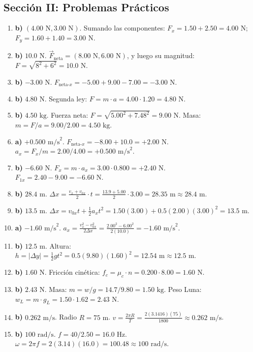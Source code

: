 \documentclass[11pt,a4paper]{article}
\begin{document}
\subsection*{Sección II: Problemas Prácticos}
\begin{enumerate}
    \item \textbf{b)} $(4.00 \text{ N}, 3.00 \text{ N})$. Sumando las componentes: $F_x = 1.50 + 2.50 = 4.00 \text{ N}$; $F_y = 1.60 + 1.40 = 3.00 \text{ N}$.
    \item \textbf{b)} $10.0 \text{ N}$. $\vec{F}_{\text{neta}} = (8.00\text{ N}, 6.00\text{ N})$, y luego su magnitud: $F = \sqrt{8^2 + 6^2} = 10.0 \text{ N}$.
    \item \textbf{b)} $-3.00 \text{ N}$. $F_{\text{neta-}x} = -5.00 + 9.00 - 7.00 = -3.00 \text{ N}$.
    \item \textbf{b)} $4.80 \text{ N}$. Segunda ley: $F = m \cdot a = 4.00 \cdot 1.20 = 4.80 \text{ N}$.
    \item \textbf{b)} $4.50 \text{ kg}$. Fuerza neta: $F = \sqrt{5.00^2 + 7.48^2} = 9.00 \text{ N}$. Masa: $m = F / a = 9.00 / 2.00 = 4.50 \text{ kg}$.
    \item \textbf{a)} $+0.500 \text{ m/s}^2$. $F_{\text{neta-}x} = -8.00 + 10.0 = +2.00 \text{ N}$. $a_x = F_x / m = 2.00 / 4.00 = +0.500 \text{ m/s}^2$.
    \item \textbf{b)} $-6.60 \text{ N}$. $F_x = m \cdot a_x = 3.00 \cdot 0.800 = +2.40 \text{ N}$. $F_{1x} = 2.40 - 9.00 = -6.60 \text{ N}$.
    \item \textbf{b)} $28.4 \text{ m}$. $\Delta x = \frac{v_x + v_{0x}}{2} \cdot t = \frac{13.9 + 5.00}{2} \cdot 3.00 = 28.35 \text{ m} \approx 28.4 \text{ m}$.
    \item \textbf{b)} $13.5 \text{ m}$. $\Delta x = v_{0x} t + \frac{1}{2} a_x t^2 = 1.50(3.00) + 0.5(2.00)(3.00)^2 = 13.5 \text{ m}$.
    \item \textbf{a)} $-1.60 \text{ m/s}^2$. $a_x = \frac{v_x^2 - v_{0x}^2}{2\Delta x} = \frac{2.00^2 - 6.00^2}{2(10.0)} = -1.60 \text{ m/s}^2$.
    \item \textbf{b)} $12.5 \text{ m}$. Altura: $h = |\Delta y| = \frac{1}{2} g t^2 = 0.5(9.80)(1.60)^2 = 12.54 \text{ m} \approx 12.5 \text{ m}$.
    \item \textbf{b)} $1.60 \text{ N}$. Fricción cinética: $f_c = \mu_c \cdot n = 0.200 \cdot 8.00 = 1.60 \text{ N}$.
    \item \textbf{b)} $2.43 \text{ N}$. Masa: $m = w / g = 14.7 / 9.80 = 1.50 \text{ kg}$. Peso Luna: $w_L = m \cdot g_L = 1.50 \cdot 1.62 = 2.43 \text{ N}$.
    \item \textbf{b)} $0.262 \text{ m/s}$. Radio $R = 75 \text{ m}$. $v = \frac{2\pi R}{T} = \frac{2(3.1416)(75)}{1800} \approx 0.262 \text{ m/s}$.
    \item \textbf{b)} $100 \text{ rad/s}$. $f = 40 / 2.50 = 16.0 \text{ Hz}$. $\omega = 2\pi f = 2(3.14)(16.0) = 100.48 \approx 100 \text{ rad/s}$.
\end{enumerate}
\end{document}

